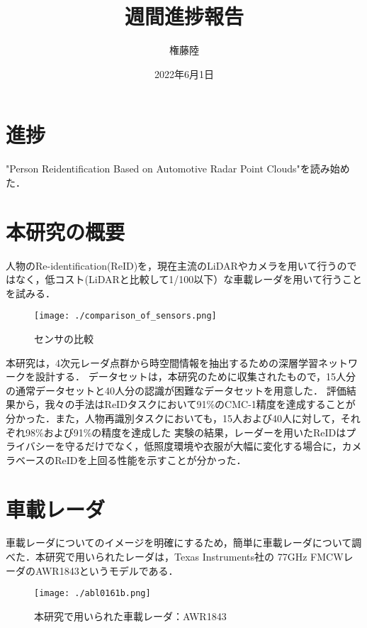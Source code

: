 \documentclass[dvipdfmx]{jsarticle}
\begin{document}
\title{週間進捗報告}
\author{権藤陸}
\date{2022年6月1日}
\maketitle
\section{進捗}
"Person Reidentification Based on Automotive Radar Point Clouds"を読み始めた．
\section{本研究の概要}
人物のRe-identification(ReID)を，現在主流のLiDARやカメラを用いて行うのではなく，低コスト(LiDARと比較して1/100以下）な車載レーダを用いて行うことを試みる．

\begin{figure}[htbp]
\begin{center}
\texttt{[image: ./comparison\_of\_sensors.png]}
\end{center}
\caption{センサの比較}
\end{figure}

本研究は，4次元レーダ点群から時空間情報を抽出するための深層学習ネットワークを設計する．
データセットは，本研究のために収集されたもので，15人分の通常データセットと40人分の認識が困難なデータセットを用意した．
評価結果から，我々の手法はReIDタスクにおいて91\%のCMC-1精度を達成することが分かった．また，人物再識別タスクにおいても，15人および40人に対して，それぞれ98\%および91\%の精度を達成した
実験の結果，レーダーを用いたReIDはプライバシーを守るだけでなく，低照度環境や衣服が大幅に変化する場合に，カメラベースのReIDを上回る性能を示すことが分かった．

\newpage

\section{車載レーダ}
車載レーダについてのイメージを明確にするため，簡単に車載レーダについて調べた．本研究で用いられたレーダは，Texas Instruments社の 77GHz FMCWレーダのAWR1843というモデルである．

\begin{figure}[H]
\begin{center}
\texttt{[image: ./abl0161b.png]}
\end{center}
\caption{本研究で用いられた車載レーダ：AWR1843}
\end{figure}
\end{document}
